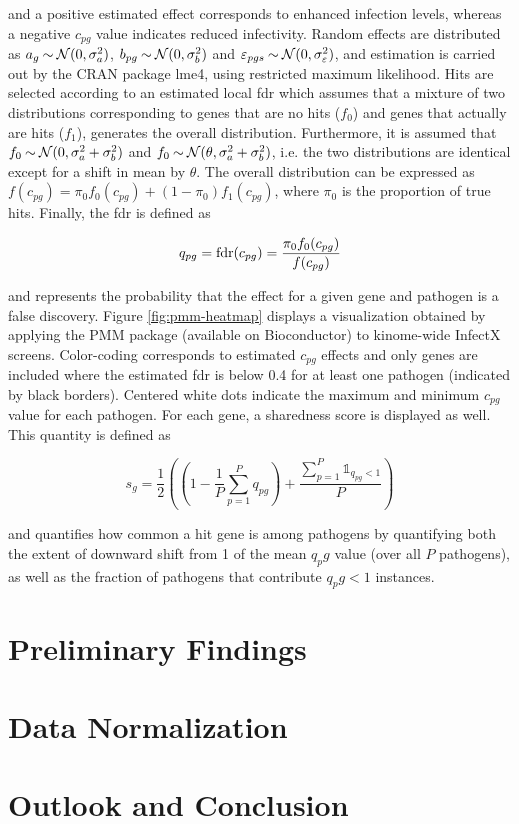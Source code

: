 and a positive estimated effect corresponds to enhanced infection levels, whereas a negative $c_{pg}$ value indicates reduced infectivity. Random effects are distributed as $a_g \mathbin{\sim} \operatorname{\mathcal{N}}(0, \sigma_a^2)$, $b_{pg} \mathbin{\sim} \operatorname{\mathcal{N}}(0, \sigma_b^2)$ and $\varepsilon_{pgs} \mathbin{\sim} \operatorname{\mathcal{N}}(0, \sigma_\varepsilon^2)$, and estimation is carried out by the CRAN package lme4, using restricted maximum likelihood. Hits are selected according to an estimated local \gls{fdr} which assumes that a mixture of two distributions corresponding to genes that are no hits ($f_0$) and genes that actually are hits ($f_1$), generates the overall distribution. Furthermore, it is assumed that $f_0 \mathbin{\sim} \operatorname{\mathcal{N}}(0, \sigma_a^2+\sigma_b^2)$ and $f_0 \mathbin{\sim} \operatorname{\mathcal{N}}(\theta, \sigma_a^2+\sigma_b^2)$, i.e. the two distributions are identical except for a shift in mean by $\theta$. The overall distribution can be expressed as $f(c_{pg}) = \pi_0 f_0(c_{pg}) + (1-\pi_0) f_1(c_{pg})$, where $\pi_0$ is the proportion of true hits. Finally, the \gls{fdr} is defined as

\begin{equation}
  q_{pg} = \operatorname{fdr}(c_{pg}) = \frac{\pi_0 f_0(c_{pg})}{f(c_{pg})}
\end{equation}

and represents the probability that the effect for a given gene and pathogen is a false discovery. Figure \ref{fig:pmm-heatmap} displays a visualization obtained by applying the PMM package (available on Bioconductor) to kinome-wide InfectX screens. Color-coding corresponds to estimated $c_{pg}$ effects and only genes are included where the estimated \gls{fdr} is below 0.4 for at least one pathogen (indicated by black borders). Centered white dots indicate the maximum and minimum $c_{pg}$ value for each pathogen. For each gene, a sharedness score is displayed as well. This quantity is defined as

\begin{equation}
  s_g = \frac{1}{2} \left(\left(1-\frac{1}{P}\sum_{p=1}^P q_{pg}\right) + \frac{\sum_{p=1}^P \mathds{1}_{q_{pg} < 1}}{P}\right)
\end{equation}

and quantifies how common a hit gene is among pathogens by quantifying both the extent of downward shift from 1 of the mean $q_pg$ value (over all $P$ pathogens), as well as the fraction of pathogens that contribute $q_pg < 1$ instances.

\section{Preliminary Findings}
\section{Data Normalization}
\section{Outlook and Conclusion}